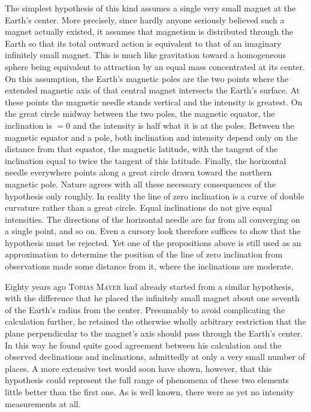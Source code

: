 The simplest hypothesis of this kind assumes a single very small magnet at the Earth's center. More precisely, since hardly anyone seriously believed such a magnet actually existed, it assumes that magnetism is distributed through the Earth so that its total outward action is equivalent to that of an imaginary infinitely small magnet. This is much like gravitation toward a homogeneous sphere being equivalent to attraction by an equal mass concentrated at its center. On this assumption, the Earth's magnetic poles are the two points where the extended magnetic axis of that central magnet intersects the Earth's surface. At these points the magnetic needle stands vertical and the intensity is greatest. On the great circle midway between the two poles, the magnetic equator, the inclination is $=0$ and the intensity is half what it is at the poles. Between the magnetic equator and a pole, both inclination and intensity depend only on the distance from that equator, the magnetic latitude, with the tangent of the inclination equal to twice the tangent of this latitude. Finally, the horizontal needle everywhere points along a great circle drawn toward the northern magnetic pole. Nature agrees with all these necessary consequences of the hypothesis only roughly. In reality the line of zero inclination is a curve of double curvature rather than a great circle. Equal inclinations do not give equal intensities. The directions of the horizontal needle are far from all converging on a single point, and so on. Even a cursory look therefore suffices to show that the hypothesis must be rejected. Yet one of the propositions above is still used as an approximation to determine the position of the line of zero inclination from observations made some distance from it, where the inclinations are moderate.

Eighty years ago \textsc{Tobias Mayer} had already started from a similar hypothesis, with the difference that he placed the infinitely small magnet about one seventh of the Earth's radius from the center. Presumably to avoid complicating the calculation further, he retained the otherwise wholly arbitrary restriction that the plane perpendicular to the magnet's axis should pass through the Earth's center. In this way he found quite good agreement between his calculation and the observed declinations and inclinations, admittedly at only a very small number of places. A more extensive test would soon have shown, however, that this hypothesis could represent the full range of phenomena of these two elements little better than the first one. As is well known, there were as yet no intensity measurements at all.

